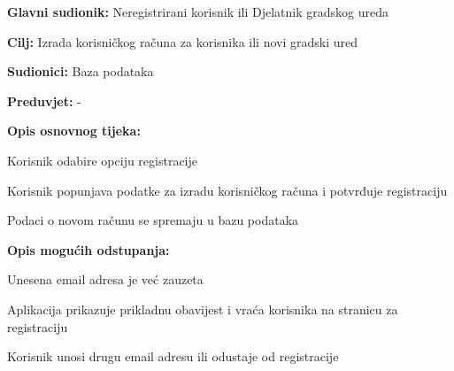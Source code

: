 				
				\noindent {}
				\begin{packed_item}
					
					\item \textbf{Glavni sudionik:} Neregistrirani korisnik ili Djelatnik gradskog ureda
					\item  \textbf{Cilj:} Izrada korisničkog računa za korisnika ili novi gradski ured
					\item  \textbf{Sudionici:} Baza podataka
					\item  \textbf{Preduvjet:} -
					
					\item  \textbf{Opis osnovnog tijeka:}
					\item[] \begin{packed_enum}
						\item Korisnik odabire opciju registracije
						\item Korisnik popunjava podatke za izradu korisničkog računa i potvrđuje registraciju
						\item Podaci o novom računu se spremaju u bazu podataka
					\end{packed_enum}
					
					\item  \textbf{Opis mogućih odstupanja:}
					\item[] \begin{packed_item}
						\item[2.a] Unesena email adresa je već zauzeta
						\item[] \begin{packed_enum}
							\item Aplikacija prikazuje prikladnu obavijest i vraća korisnika na stranicu za registraciju
							\item Korisnik unosi drugu email adresu ili odustaje od registracije
						\end{packed_enum}
					\end{packed_item}
				\end{packed_item}
				

